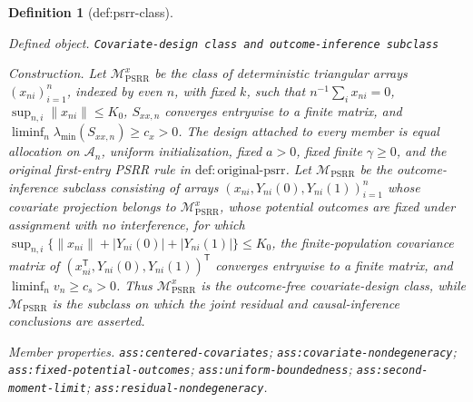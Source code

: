 \documentclass{article}
\newtheorem{definition}{Definition}
\begin{document}
\begin{definition}[def:psrr-class]\label{def:psrr-class}
\par\smallskip\noindent\emph{Defined object.} \texttt{Covariate-\allowbreak{}design class and outcome-\allowbreak{}inference subclass}
\par\smallskip\noindent\emph{Construction.} Let \(\mathcal M_{\mathrm{PSRR}}^{x}\) be the class of deterministic triangular arrays \((x_{ni})_{i=1}^n\), indexed by even \(n\), with fixed \(k\), such that \(n^{-1}\sum_i x_{ni}=0\), \(\sup_{n,i}\|x_{ni}\|\le K_0\), \(S_{xx,n}\) converges entrywise to a finite matrix, and \(\liminf_n\lambda_{\min}(S_{xx,n})\ge c_x>0\).  The design attached to every member is equal allocation on \(\mathcal A_n\), uniform initialization, fixed \(a>0\), fixed finite \(\gamma\ge0\), and the original first-entry PSRR rule in \(\mathrm{def{:}original\mbox{-}psrr}\).  Let \(\mathcal M_{\mathrm{PSRR}}\) be the outcome-inference subclass consisting of arrays \((x_{ni},Y_{ni}(0),Y_{ni}(1))_{i=1}^n\) whose covariate projection belongs to \(\mathcal M_{\mathrm{PSRR}}^{x}\), whose potential outcomes are fixed under assignment with no interference, for which \(\sup_{n,i}\{\|x_{ni}\|+|Y_{ni}(0)|+|Y_{ni}(1)|\}\le K_0\), the finite-population covariance matrix of \((x_{ni}^{\mathsf T},Y_{ni}(0),Y_{ni}(1))^{\mathsf T}\) converges entrywise to a finite matrix, and \(\liminf_n v_n\ge c_s>0\).  Thus \(\mathcal M_{\mathrm{PSRR}}^{x}\) is the outcome-free covariate-design class, while \(\mathcal M_{\mathrm{PSRR}}\) is the subclass on which the joint residual and causal-inference conclusions are asserted.
\par\smallskip\noindent\emph{Member properties.} \texttt{ass:\allowbreak{}centered-\allowbreak{}covariates}; \texttt{ass:\allowbreak{}covariate-\allowbreak{}nondegeneracy}; \texttt{ass:\allowbreak{}fixed-\allowbreak{}potential-\allowbreak{}outcomes}; \texttt{ass:\allowbreak{}uniform-\allowbreak{}boundedness}; \texttt{ass:\allowbreak{}second-\allowbreak{}moment-\allowbreak{}limit}; \texttt{ass:\allowbreak{}residual-\allowbreak{}nondegeneracy}.
\end{definition}
\end{document}
